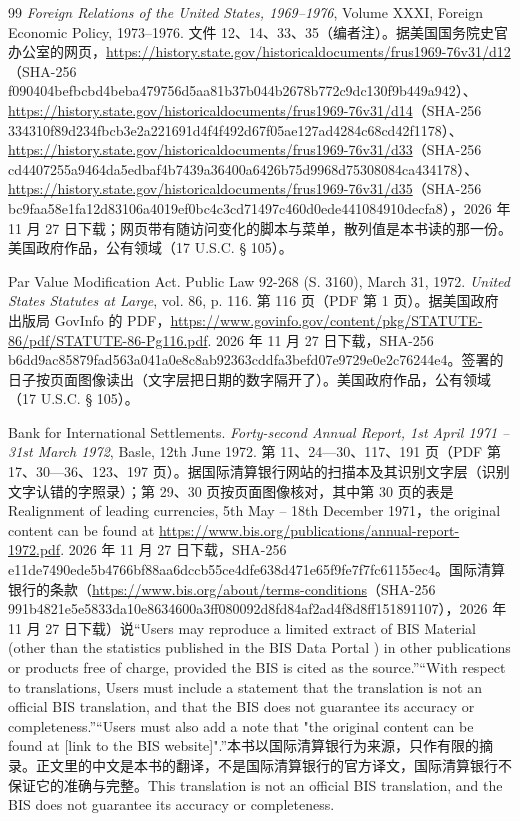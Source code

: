 \begin{thebibliography}{99}
 \emph{Foreign Relations of the United States, 1969--1976}, Volume XXXI, Foreign Economic Policy, 1973--1976. 文件 12、14、33、35（编者注）。据美国国务院史官办公室的网页，\url{https://history.state.gov/historicaldocuments/frus1969-76v31/d12}（SHA-256 f090404befbcbd4beba479756d5aa81b37b044b2678b772c9dc130f9b449a942）、\url{https://history.state.gov/historicaldocuments/frus1969-76v31/d14}（SHA-256 334310f89d234fbcb3e2a221691d4f4f492d67f05ae127ad4284c68cd42f1178）、\url{https://history.state.gov/historicaldocuments/frus1969-76v31/d33}（SHA-256 cd4407255a9464da5edbaf4b7439a36400a6426b75d9968d75308084ca434178）、\url{https://history.state.gov/historicaldocuments/frus1969-76v31/d35}（SHA-256 bc9faa58e1fa12d83106a4019ef0bc4c3cd71497c460d0ede441084910decfa8），2026 年 11 月 27 日下载；网页带有随访问变化的脚本与菜单，散列值是本书读的那一份。美国政府作品，公有领域（17 U.S.C. § 105）。

 Par Value Modification Act. Public Law 92-268 (S. 3160), March 31, 1972. \emph{United States Statutes at Large}, vol. 86, p. 116. 第 116 页（PDF 第 1 页）。据美国政府出版局 GovInfo 的 PDF，\url{https://www.govinfo.gov/content/pkg/STATUTE-86/pdf/STATUTE-86-Pg116.pdf}. 2026 年 11 月 27 日下载，SHA-256 b6dd9ac85879fad563a041a0e8c8ab92363cddfa3befd07e9729e0e2c76244e4。签署的日子按页面图像读出（文字层把日期的数字隔开了）。美国政府作品，公有领域（17 U.S.C. § 105）。

 Bank for International Settlements. \emph{Forty-second Annual Report, 1st April 1971 -- 31st March 1972}, Basle, 12th June 1972. 第 11、24—30、117、191 页（PDF 第 17、30—36、123、197 页）。据国际清算银行网站的扫描本及其识别文字层（识别文字认错的字照录）；第 29、30 页按页面图像核对，其中第 30 页的表是 Realignment of leading currencies, 5th May -- 18th December 1971，the original content can be found at \url{https://www.bis.org/publications/annual-report-1972.pdf}. 2026 年 11 月 27 日下载，SHA-256 e11de7490ede5b4766bf88aa6dccb55ce4dfe638d471e65f9fe7f7fc61155ec4。国际清算银行的条款（\url{https://www.bis.org/about/terms-conditions}（SHA-256 991b4821e5e5833da10e8634600a3ff080092d8fd84af2ad4f8d8ff151891107），2026 年 11 月 27 日下载）说“Users may reproduce a limited extract of BIS Material (other than the statistics published in the BIS Data Portal ) in other publications or products free of charge, provided the BIS is cited as the source.”“With respect to translations, Users must include a statement that the translation is not an official BIS translation, and that the BIS does not guarantee its accuracy or completeness.”“Users must also add a note that "the original content can be found at [link to the BIS website]".”本书以国际清算银行为来源，只作有限的摘录。正文里的中文是本书的翻译，不是国际清算银行的官方译文，国际清算银行不保证它的准确与完整。This translation is not an official BIS translation, and the BIS does not guarantee its accuracy or completeness.


\end{thebibliography}
